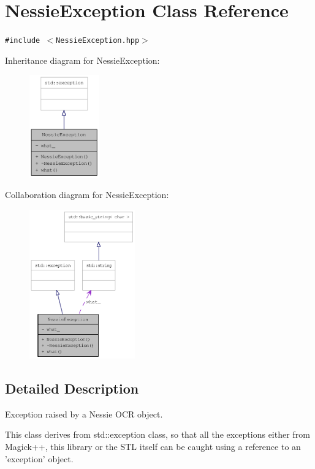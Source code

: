 \hypertarget{class_nessie_exception}{
\section{NessieException Class Reference}
\label{class_nessie_exception}
}
{\tt \#include $<$NessieException.hpp$>$}

Inheritance diagram for NessieException:\nopagebreak
\begin{figure}[H]
\begin{center}
\leavevmode
\includegraphics[width=85pt]{class_nessie_exception__inherit__graph}
\end{center}
\end{figure}
Collaboration diagram for NessieException:\nopagebreak
\begin{figure}[H]
\begin{center}
\leavevmode
\includegraphics[width=129pt]{class_nessie_exception__coll__graph}
\end{center}
\end{figure}


\subsection{Detailed Description}
Exception raised by a Nessie OCR object. 

This class derives from std::exception class, so that all the exceptions either from Magick++, this library or the STL itself can be caught using a reference to an 'exception' object.

